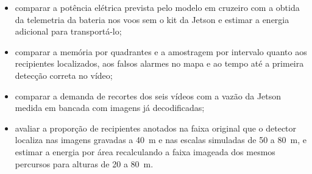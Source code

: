 \begin{itemize}
    \item comparar a potência elétrica prevista pelo modelo em cruzeiro com a obtida da telemetria da bateria nos voos sem o kit da Jetson e estimar a energia adicional para transportá-lo;
    \item comparar a memória por quadrantes e a amostragem por intervalo quanto aos recipientes localizados, aos falsos alarmes no mapa e ao tempo até a primeira detecção correta no vídeo;
    \item comparar a demanda de recortes dos seis vídeos com a vazão da Jetson medida em bancada com imagens já decodificadas;
    \item avaliar a proporção de recipientes anotados na faixa original que o detector localiza nas imagens gravadas a 40~m e nas escalas simuladas de 50 a 80~m, e estimar a energia por área recalculando a faixa imageada dos mesmos percursos para alturas de 20 a 80~m.
\end{itemize}
